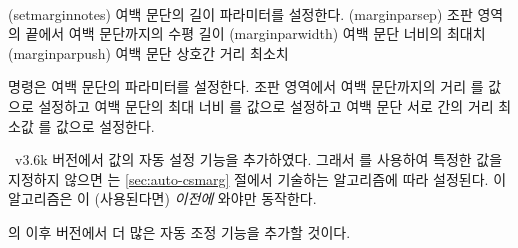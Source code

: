 \begin{syntax}
\cmd{\setmarginnotes} \\
\end{syntax}
\glossary(setmarginnotes)%
  {}%
  {여백 문단의 길이 파라미터를 설정한다.}
\glossary(marginparsep)%
  {}%
  {조판 영역의 끝에서 여백 문단까지의 수평 길이}
\glossary(marginparwidth)%
  {}%
  {여백 문단 너비의 최대치}
\glossary(marginparpush)%
  {}%
  {여백 문단 상호간 거리 최소치}

\cmd{\setmarginnotes} 명령은 여백 문단의 파라미터를 설정한다.
조판 영역에서 여백 문단까지의 거리 \lnc{\marginparsep}를 
값으로 설정하고 여백 문단의 최대 너비 \lnc{\marginparwidth}를 
 값으로 설정하고 여백 문단 서로 간의 거리 최소값 \lnc{\marginparpush}를  값으로 설정한다.

\begin{note}
\theclass\ v3.6k 버전에서 \lnc{\marginparwidth} 값의
자동 설정 기능을 추가하였다. 그래서 \cmd{\setmarginnotes}를
사용하여 특정한 값을 지정하지 않으면 \cmd{\marginparwidth}는
\ref{sec:auto-csmarg} 절에서 기술하는 알고리즘에 따라 설정된다.
이 알고리즘은 \cmd{\marginparmargin}이 (사용된다면) \cmd{\checkandfixthelayout}
\emph{이전에} 와야만 동작한다.

\theclass 의 이후 버전에서 더 많은 자동 조정 기능을 추가할 것이다.
\end{note}

